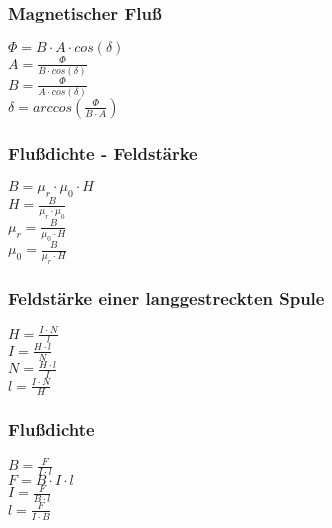 \subsubsection{Magnetischer Fluß} 
\begin{minipage}{0.45\textwidth} 
$ \Phi  = B\cdot A\cdot cos(\delta ) $\\ 
$ A = \frac{ \Phi }{B\cdot cos(\delta )} $\\ 
$ B = \frac{ \Phi }{A\cdot cos(\delta )} $\\ 
$ \delta =arccos(\frac{ \Phi }{B\cdot A}) $\\ 
\end{minipage} 
\begin{minipage}{0.45\textwidth} 
 
\end{minipage} 
\subsubsection{Flußdichte - Feldstärke} 
\begin{minipage}{0.45\textwidth} 
$ B = \mu _{r} \cdot \mu _{0} \cdot H $\\ 
$ H =\frac{ B}{\mu _{r} \cdot \mu _{0} } $\\ 
$ \mu _{r} =\frac{ B}{\mu _{0} \cdot H} $\\ 
$ \mu _{0} =\frac{ B}{\mu _{r} \cdot H} $\\ 
\end{minipage} 
\begin{minipage}{0.45\textwidth} 
 
\end{minipage} 
\subsubsection{Feldstärke einer langgestreckten Spule} 
\begin{minipage}{0.45\textwidth} 
$ H = \frac{I\cdot N}{ l} $\\ 
$ I = \frac{H\cdot l}{ N} $\\ 
$ N = \frac{H\cdot l}{ I} $\\ 
$ l = \frac{I\cdot N}{ H} $\\ 
\end{minipage} 
\begin{minipage}{0.45\textwidth} 
 
\end{minipage} 
\subsubsection{Flußdichte} 
\begin{minipage}{0.45\textwidth} 
$ B = \frac{ F}{I\cdot l} $\\ 
$ F = B\cdot I\cdot l $\\ 
$ I = \frac{ F}{B\cdot l} $\\ 
$ l = \frac{ F}{I\cdot B} $\\ 
\end{minipage} 
\begin{minipage}{0.45\textwidth} 
 
\end{minipage} 
